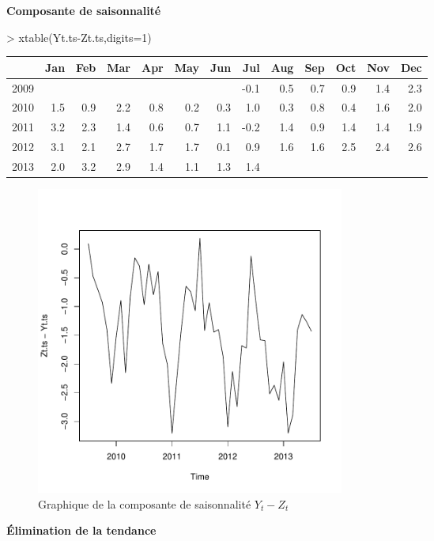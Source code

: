 \documentclass{article}
\begin{document}
\textbf{Composante de saisonnalité}
\begin{Schunk}
\begin{Sinput}
> xtable(Yt.ts-Zt.ts,digits=1)
\end{Sinput}
\begin{table}[ht]
\centering
\begin{tabular}{rrrrrrrrrrrrr}
  \hline
 & Jan & Feb & Mar & Apr & May & Jun & Jul & Aug & Sep & Oct & Nov & Dec \\ 
  \hline
2009 &  &  &  &  &  &  & -0.1 & 0.5 & 0.7 & 0.9 & 1.4 & 2.3 \\ 
  2010 & 1.5 & 0.9 & 2.2 & 0.8 & 0.2 & 0.3 & 1.0 & 0.3 & 0.8 & 0.4 & 1.6 & 2.0 \\ 
  2011 & 3.2 & 2.3 & 1.4 & 0.6 & 0.7 & 1.1 & -0.2 & 1.4 & 0.9 & 1.4 & 1.4 & 1.9 \\ 
  2012 & 3.1 & 2.1 & 2.7 & 1.7 & 1.7 & 0.1 & 0.9 & 1.6 & 1.6 & 2.5 & 2.4 & 2.6 \\ 
  2013 & 2.0 & 3.2 & 2.9 & 1.4 & 1.1 & 1.3 & 1.4 &  &  &  &  &  \\ 
   \hline
\end{tabular}
\end{table}\end{Schunk}

\begin{figure}[p]
  \centering
  \includegraphics[height=4in, width=4in]{exercice1-graph3.pdf}
  \caption{Graphique de la composante de saisonnalité $Y_t-Z_t$}
  \label{fig:exercice1-graph3}
\end{figure}
\clearpage
\textbf{Élimination de la tendance}
\end{document}
